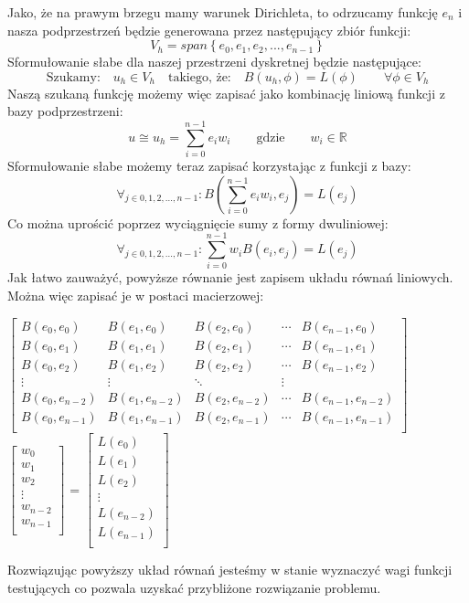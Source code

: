 \documentclass[a4paper]{article}
\begin{document}
  Jako, że na prawym brzegu mamy warunek Dirichleta, to odrzucamy funkcję $e_n$ i
  nasza podprzestrzeń będzie generowana przez następujący zbiór funkcji:
  \[V_h = span \left\{e_0, e_1, e_2, ... , e_{n-1}\right\}\]
  Sformułowanie słabe dla naszej przestrzeni dyskretnej będzie następujące:
  \[\text{Szukamy:} \quad u_h \in V_h \quad \text{takiego, że:} \quad B(u_h, \phi) = L(\phi) \qquad \forall \phi \in V_h \]
  Naszą szukaną funkcję możemy więc zapisać jako kombinację liniową funkcji z bazy podprzestrzeni:
  \[u \cong u_h = \sum_{i=0}^{n-1} e_iw_i \qquad \text{gdzie} \qquad w_i \in \mathbb{R}\]
  Sformułowanie słabe możemy teraz zapisać korzystając z funkcji z bazy:
  \[\forall_{j\in {0,1,2, ... , n-1}} : B(\sum_{i=0}^{n-1} e_iw_i, e_j) = L(e_j)\]
  Co można uprościć poprzez wyciągnięcie sumy z formy dwuliniowej:
  \[\forall_{j\in {0,1,2, ... , n-1}} : \sum_{i=0}^{n-1}w_iB(e_i, e_j) = L(e_j)\]
  Jak łatwo zauważyć, powyższe równanie jest zapisem układu równań liniowych. Można więc zapisać
  je w postaci macierzowej:\\
  \begin{center}
  $
  \left[ {\begin{array}{ccccc}
    B(e_0, e_0) & B(e_1, e_0) & B(e_2, e_0) & \cdots & B(e_{n-1}, e_0) \\
    B(e_0, e_1) & B(e_1, e_1) & B(e_2, e_1) & \cdots & B(e_{n-1}, e_1) \\
    B(e_0, e_2) & B(e_1, e_2) & B(e_2, e_2) & \cdots & B(e_{n-1}, e_2) \\
    \vdots & \vdots & \ddots & \vdots\\
    B(e_0, e_{n-2}) & B(e_1, e_{n-2}) & B(e_2, e_{n-2}) & \cdots & B(e_{n-1}, e_{n-2}) \\
    B(e_0, e_{n-1}) & B(e_1, e_{n-1}) & B(e_2, e_{n-1}) & \cdots & B(e_{n-1}, e_{n-1}) \\
  \end{array} } \right] $
  $
  \left[ {\begin{array}{c}
    w_0 \\
    w_1 \\
    w_2 \\
    \vdots \\
    w_{n-2} \\
    w_{n-1} \\
  \end{array} } \right]$ = 
  $\left[ {\begin{array}{c}
    L(e_0) \\
    L(e_1)  \\
    L(e_2)  \\
    \vdots \\
    L(e_{n-2})  \\
    L(e_{n-1})  \\
  \end{array} } \right]$
\end{center}
Rozwiązując powyższy układ równań jesteśmy w stanie wyznaczyć wagi funkcji testujących co pozwala
uzyskać przybliżone rozwiązanie problemu.
\end{document}
